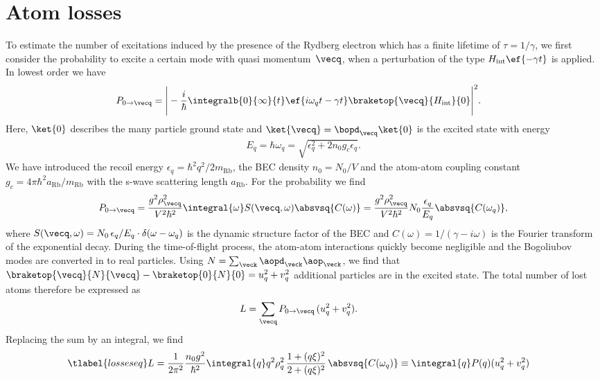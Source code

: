 \section{Atom losses}
To estimate the number of excitations induced by the presence of the Rydberg electron which has a finite lifetime of $\tau=1/\gamma$, we first consider the probability to excite a certain mode with quasi momentum~$\vecq$, when a perturbation of the type $H_\text{int} \ef{-\gamma t}$ is applied. In lowest order we have
\begin{align}
P_{0\rightarrow\vecq}&=\Bigg|-\frac{i}{\hbar}\integralb{0}{\infty}{t}\ef{i\omega_{q}t-\gamma t}\braketop{\vecq}{H_\text{int}}{0}\Bigg|^2.
\end{align}
Here, $\ket{0}$ describes the many particle ground state and $\ket{\vecq}=\bopd_{\vecq}\ket{0}$ is the excited state with energy
\begin{align}
    E_{q}=\hbar\omega_{q}=\sqrt{\epsilon_{q}^2+2n_0g_c\epsilon_{q}}.
\end{align}
We have introduced the recoil energy $\epsilon_{q}=\hbar^2 q^2/2m_\text{Rb}$, the BEC density $n_0=N_0/V$ and the atom-atom coupling constant $g_c=4\pi \hbar ^2a_{\text{Rb}}/m_{\text{Rb}}$ with the s-wave scattering length $a_{\text{Rb}}$.
For the probability we find
\begin{align}
P_{0\rightarrow\vecq}=\frac{g^2 \rho_{\vecq}^2 }{V^2\hbar^2}   \integral{\omega}S(\vecq,\omega)\absvsq{C(\omega)} = \frac{g^2 \rho_{\vecq}^2}{V^2\hbar^2} N_0 \frac{\epsilon_{q}}{E_{q}} \absvsq{C(\omega_q)},
\end{align}
where $S({\vecq},\omega)=N_0 \,\epsilon_{q}/E_{q} \cdot \delta(\omega-\omega_{q})$ is the dynamic structure factor of the BEC and $C(\omega)=1/(\gamma-i \omega)$ is the Fourier transform of the exponential decay.
During the time-of-flight process, the atom-atom interactions quickly become negligible and the Bogoliubov modes are converted in to real particles. Using $N=\sum_{\veck} \aopd_{\veck}\aop_{\veck}$, we find that $\braketop{\vecq}{N}{\vecq}-\braketop{0}{N}{0} = u_{q}^2+v_{q}^2$ additional particles are in the excited state. The total number of lost atoms therefore be expressed as
\begin{align}
L &= \sum_{\vecq} P_{0\rightarrow\vecq}\, (u_{q}^2+v_{q}^2).
\end{align}
Replacing the sum by an integral, we find
\begin{align} \tlabel{losseseq}
L&= \frac{1}{2\pi^2}\frac{n_0 g^2}{\hbar^2} \integral{q} q^2\rho_q^2\,\frac{1+(q\xi)^2}{2+(q\xi)^2} \, \absvsq{C(\omega_q)}  \equiv \integral{q} P(q) (u_{q}^2+v_{q}^2)
\end{align}

